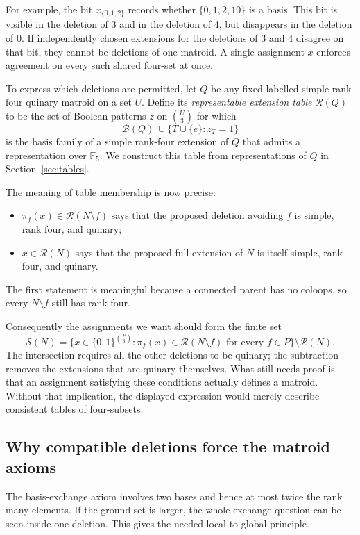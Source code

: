 \documentclass[11pt,a4paper]{article}
\theoremstyle{definition}
\newcommand{\F}{\mathbb F_5}
\newcommand{\B}{\mathcal B}
\newcommand{\RR}{\mathcal R}
\begin{document}
For example, the bit $x_{\{0,1,2\}}$ records whether
$\{0,1,2,10\}$ is a basis. This bit is visible in the deletion of
3 and in the deletion of 4, but disappears in the deletion of 0.
If independently chosen extensions for the deletions of 3 and 4
disagree on that bit, they cannot be deletions of one matroid. A
single assignment $x$ enforces agreement on every such shared
four-set at once.

To express which deletions are permitted, let $Q$ be any fixed
labelled simple rank-four quinary matroid on a set $U$. Define its
\emph{representable extension table} $\RR(Q)$ to be the set of Boolean
patterns $z$ on $\binom U3$ for which
\[
 \B(Q)\ \cup\{T\cup\{e\}:z_T=1\}
\]
is the basis family of a simple rank-four extension of $Q$
that admits a representation over $\F$. We construct this table
from representations of $Q$ in Section~\ref{sec:tables}.

The meaning of table membership is now precise:
\begin{itemize}
\item $\pi_f(x)\in\RR(N\setminus f)$ says that the proposed deletion
avoiding $f$ is simple, rank four, and quinary;
\item $x\in\RR(N)$ says that the proposed full extension of $N$ is
itself simple, rank four, and quinary.
\end{itemize}
The first statement is meaningful because a connected parent has no
coloops, so every $N\setminus f$ still has rank four.

Consequently the assignments we want should form the finite set
\[
 \mathcal S(N)=
 \bigl\{x\in\{0,1\}^{\binom P3}:
       \pi_f(x)\in\RR(N\setminus f)\text{ for every }f\in P\bigr\}
       \setminus\RR(N).
\]
The intersection requires all the other deletions to be quinary;
the subtraction removes the extensions that are quinary themselves.
What still needs proof is that an assignment satisfying these
conditions actually defines a matroid. Without that implication,
the displayed expression would merely describe consistent tables
of four-subsets.

\subsection{Why compatible deletions force the matroid axioms}

The basis-exchange axiom involves two bases and hence at most twice
the rank many elements. If the ground set is larger, the whole
exchange question can be seen inside one deletion. This gives the
needed local-to-global principle.
\end{document}
